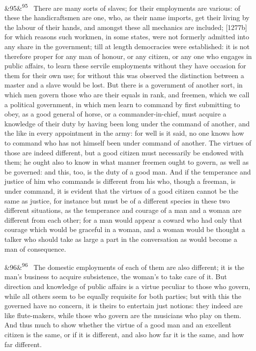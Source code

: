 \documentclass[12pt]{article}
\newcommand{\para}[1][]{\par\noindent\ifx&#1&\else\textsuperscript{\footnotesize #1}~\fi}
\begin{document}
\para[95] There are many sorts of slaves; for their employments are various: of these the handicraftsmen are one, who, as their name imports, get their living by the labour of their hands, and amongst these all mechanics are included; [1277b] for which reasons such workmen, in some states, were not formerly admitted into any share in the government; till at length democracies were established: it is not therefore proper for any man of honour, or any citizen, or any one who engages in public affairs, to learn these servile employments without they have occasion for them for their own use; for without this was observed the distinction between a master and a slave would be lost. But there is a government of another sort, in which men govern those who are their equals in rank, and freemen, which we call a political government, in which men learn to command by first submitting to obey, as a good general of horse, or a commander-in-chief, must acquire a knowledge of their duty by having been long under the command of another, and the like in every appointment in the army: for well is it said, no one knows how to command who has not himself been under command of another. The virtues of those are indeed different, but a good citizen must necessarily be endowed with them; he ought also to know in what manner freemen ought to govern, as well as be governed: and this, too, is the duty of a good man. And if the temperance and justice of him who commands is different from his who, though a freeman, is under command, it is evident that the virtues of a good citizen cannot be the same as justice, for instance but must be of a different species in these two different situations, as the temperance and courage of a man and a woman are different from each other; for a man would appear a coward who had only that courage which would be graceful in a woman, and a woman would be thought a talker who should take as large a part in the conversation as would become a man of consequence.

\para[96] The domestic employments of each of them are also different; it is the man's business to acquire subsistence, the woman's to take care of it. But direction and knowledge of public affairs is a virtue peculiar to those who govern, while all others seem to be equally requisite for both parties; but with this the governed have no concern, it is theirs to entertain just notions: they indeed are like flute-makers, while those who govern are the musicians who play on them. And thus much to show whether the virtue of a good man and an excellent citizen is the same, or if it is different, and also how far it is the same, and how far different.
\end{document}
